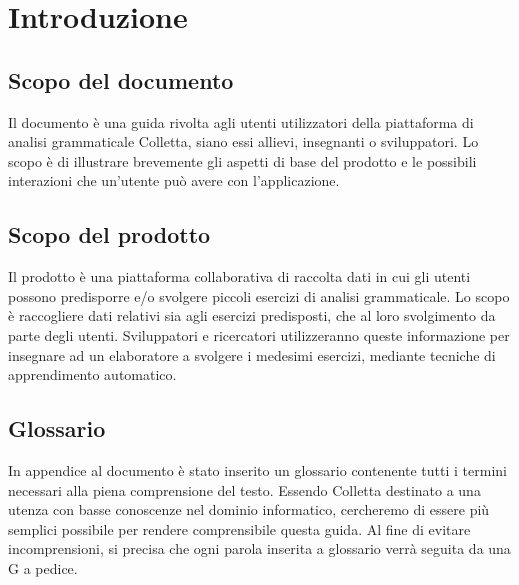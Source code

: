 \section{Introduzione}
\subsection{Scopo del documento}
Il documento \`e una guida rivolta agli utenti utilizzatori della piattaforma di analisi grammaticale Colletta, siano essi allievi, insegnanti o sviluppatori. Lo scopo è di illustrare brevemente gli aspetti di base del prodotto e le possibili interazioni che un'utente può avere con l'applicazione.
\subsection{Scopo del prodotto}
Il prodotto è una piattaforma collaborativa di raccolta dati in cui gli utenti possono predisporre e/o svolgere piccoli esercizi di analisi grammaticale. Lo scopo è raccogliere dati relativi sia  agli esercizi predisposti, che al loro svolgimento da parte degli utenti. Sviluppatori e ricercatori utilizzeranno queste informazione per insegnare ad un elaboratore a svolgere i medesimi esercizi, mediante tecniche di apprendimento automatico.
\subsection{Glossario}
In appendice al documento \`e stato inserito un glossario contenente tutti i termini necessari alla piena comprensione del testo. Essendo Colletta destinato a una utenza con basse conoscenze nel dominio informatico, cercheremo di essere più semplici possibile per rendere comprensibile questa guida. Al fine di evitare incomprensioni, si precisa che ogni parola inserita a glossario verrà seguita da una G a pedice.

